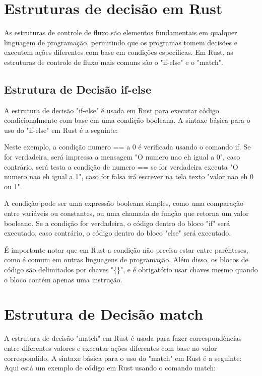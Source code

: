 \documentclass[12pt,a4paper,oneside]{abntex2}
\begin{document}
\section{Estruturas de decisão em Rust}

As estruturas de controle de fluxo são elementos fundamentais em qualquer linguagem de programação, permitindo que os programas tomem decisões e executem ações diferentes com base em condições específicas. Em Rust, as estruturas de controle de fluxo mais comuns são o "if-else" e o "match".

\subsection{Estrutura de Decisão if-else}

A estrutura de decisão "if-else" é usada em Rust para executar código condicionalmente com base em uma condição booleana. A sintaxe básica para o uso do "if-else" em Rust é a seguinte:
%


Neste exemplo, a condição numero == a 0 é verificada usando o comando if. Se for verdadeira, será impressa a mensagem "O numero nao eh igual a 0", caso contrário, será testa a condição de numero == se for verdadeira executa "O numero nao eh igual a 1", caso for falsa irá escrever na tela texto "valor nao eh 0 ou 1".

A condição pode ser uma expressão booleana simples, como uma comparação entre variáveis ou constantes, ou uma chamada de função que retorna um valor booleano. Se a condição for verdadeira, o código dentro do bloco "if" será executado, caso contrário, o código dentro do bloco "else" será executado.

É importante notar que em Rust a condição não precisa estar entre parênteses, como é comum em outras linguagens de programação. Além disso, os blocos de código são delimitados por chaves "\{\}", e é obrigatório usar chaves mesmo quando o bloco contém apenas uma instrução.

 

\section{Estrutura de Decisão match}

A estrutura de decisão "match" em Rust é usada para fazer correspondências entre diferentes valores e executar ações diferentes com base no valor correspondido. A sintaxe básica para o uso do "match" em Rust é a seguinte:
Aqui está um exemplo de código em Rust usando o comando match:
%
\end{document}
